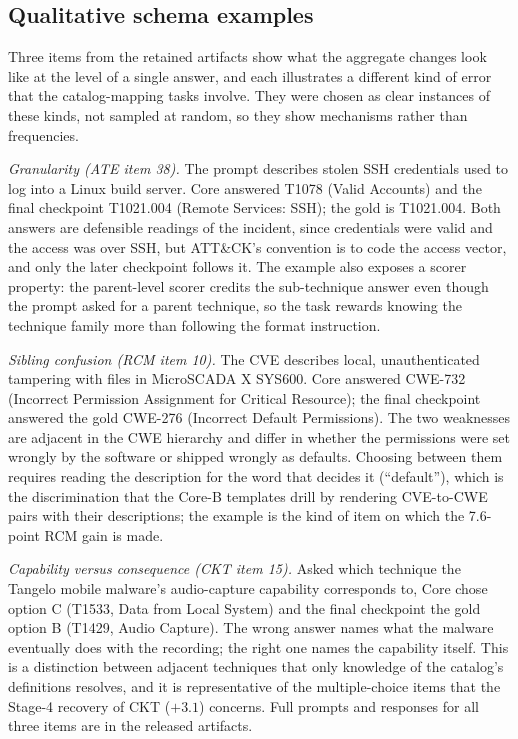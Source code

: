 \documentclass[preprint,12pt,authoryear]{elsarticle}
\begin{document}
\subsection{Qualitative schema examples}
Three items from the retained artifacts show what the aggregate changes look like at the level of a single answer, and each illustrates a different kind of error that the catalog-mapping tasks involve. They were chosen as clear instances of these kinds, not sampled at random, so they show mechanisms rather than frequencies.

\emph{Granularity (ATE item 38).} The prompt describes stolen SSH credentials used to log into a Linux build server. Core answered T1078 (Valid Accounts) and the final checkpoint T1021.004 (Remote Services: SSH); the gold is T1021.004. Both answers are defensible readings of the incident, since credentials were valid and the access was over SSH, but ATT\&CK's convention is to code the access vector, and only the later checkpoint follows it. The example also exposes a scorer property: the parent-level scorer credits the sub-technique answer even though the prompt asked for a parent technique, so the task rewards knowing the technique family more than following the format instruction.

\emph{Sibling confusion (RCM item 10).} The CVE describes local, unauthenticated tampering with files in MicroSCADA X SYS600. Core answered CWE-732 (Incorrect Permission Assignment for Critical Resource); the final checkpoint answered the gold CWE-276 (Incorrect Default Permissions). The two weaknesses are adjacent in the CWE hierarchy and differ in whether the permissions were set wrongly by the software or shipped wrongly as defaults. Choosing between them requires reading the description for the word that decides it (``default''), which is the discrimination that the Core-B templates drill by rendering CVE-to-CWE pairs with their descriptions; the example is the kind of item on which the 7.6-point RCM gain is made.

\emph{Capability versus consequence (CKT item 15).} Asked which technique the Tangelo mobile malware's audio-capture capability corresponds to, Core chose option C (T1533, Data from Local System) and the final checkpoint the gold option B (T1429, Audio Capture). The wrong answer names what the malware eventually does with the recording; the right one names the capability itself. This is a distinction between adjacent techniques that only knowledge of the catalog's definitions resolves, and it is representative of the multiple-choice items that the Stage-4 recovery of CKT ($+3.1$) concerns. Full prompts and responses for all three items are in the released artifacts.
\end{document}
